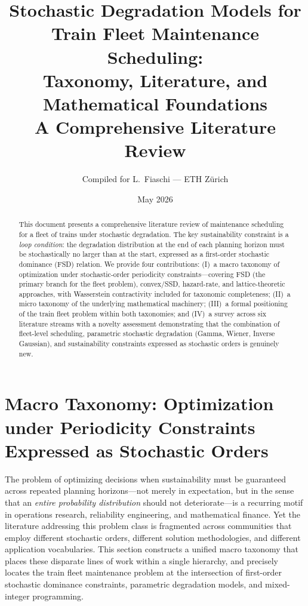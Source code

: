 \documentclass[11pt,a4paper]{article}
\title{\textbf{Stochastic Degradation Models for Train Fleet Maintenance Scheduling:\\Taxonomy, Literature, and Mathematical Foundations}\\[8pt]
\large A Comprehensive Literature Review}
\author{Compiled for L.\ Fiaschi --- ETH Z\"urich}
\date{May 2026}
\theoremstyle{plain}
\theoremstyle{definition}
\theoremstyle{remark}
\begin{document}
\maketitle

\begin{abstract}
This document presents a comprehensive literature review of maintenance scheduling for a fleet of trains under stochastic degradation.  The key sustainability constraint is a \emph{loop condition}: the degradation distribution at the end of each planning horizon must be stochastically no larger than at the start, expressed as a first-order stochastic dominance (FSD) relation.  We provide four contributions: (I)~a macro taxonomy of optimization under stochastic-order periodicity constraints---covering FSD (the primary branch for the fleet problem), convex/SSD, hazard-rate, and lattice-theoretic approaches, with Wasserstein contractivity included for taxonomic completeness; (II)~a micro taxonomy of the underlying mathematical machinery; (III)~a formal positioning of the train fleet problem within both taxonomies; and (IV)~a survey across six literature streams with a novelty assessment demonstrating that the combination of fleet-level scheduling, parametric stochastic degradation (Gamma, Wiener, Inverse Gaussian), and sustainability constraints expressed as stochastic orders is genuinely new.
\end{abstract}

\tableofcontents
\newpage


\section{Macro Taxonomy: Optimization under Periodicity Constraints Expressed as Stochastic Orders}
\label{sec:macro}

The problem of optimizing decisions when sustainability must be guaranteed
across repeated planning horizons---not merely in expectation, but in the
sense that an \emph{entire probability distribution} should not
deteriorate---is a recurring motif in operations research, reliability
engineering, and mathematical finance.  Yet the literature addressing this
problem class is fragmented across communities that employ different
stochastic orders, different solution methodologies, and different
application vocabularies.  This section constructs a unified macro taxonomy
that places these disparate lines of work within a single hierarchy, and
precisely locates the train fleet maintenance problem at the intersection
of first-order stochastic dominance constraints, parametric degradation
models, and mixed-integer programming.
\end{document}
